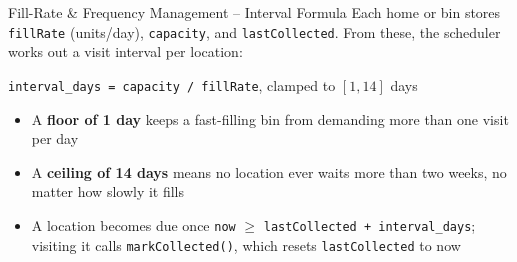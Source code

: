 \documentclass[aspectratio=169,11pt]{beamer}
\begin{document}
\begin{frame}[fragile]{Fill-Rate \& Frequency Management -- Interval Formula}
\footnotesize
Each home or bin stores \texttt{fillRate} (units/day), \texttt{capacity}, and \texttt{lastCollected}. From these, the scheduler works out a visit interval per location:
\vspace{1mm}
\begin{center}
\colorbox{GEULightBlue}{\parbox{.7\textwidth}{\centering
\texttt{interval\_days = capacity / fillRate}, clamped to $[1, 14]$ days}}
\end{center}
\vspace{1mm}
\begin{center}
\end{center}
\begin{itemize}\itemsep1pt
\item A \textbf{floor of 1 day} keeps a fast-filling bin from demanding more than one visit per day
\item A \textbf{ceiling of 14 days} means no location ever waits more than two weeks, no matter how slowly it fills
\item A location becomes due once \texttt{now} $\ge$ \texttt{lastCollected + interval\_days}; visiting it calls \texttt{markCollected()}, which resets \texttt{lastCollected} to now
\end{itemize}
\end{frame}
\end{document}
